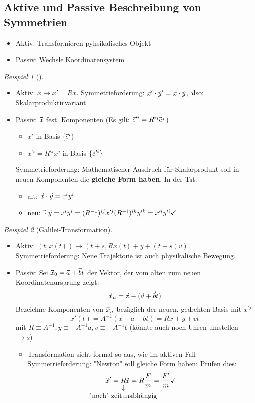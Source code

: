 \documentclass[a4paper]{scrartcl}
\renewcommand{\v}[1]{\mathrlap{\vec{\mkern-2mu\phantom{#1}}}#1}
\theoremstyle{definition}
\theoremstyle{plain}
\theoremstyle{remark}
\theoremstyle{remark}
\newtheorem{ex}{Beispiel}
\begin{document}
\subsection{Aktive und Passive Beschreibung von Symmetrien}
\label{sec-7-2}
\begin{itemize}
\item Aktiv: Transformieren pyhsikalisches Objekt
\item Passiv: Wechsle Koordinatensystem
\end{itemize}
\begin{ex}[]
\mbox{}
\begin{itemize}
\item Aktiv: $x \to x' = Rx$. Symmetrieforderung: $\v x' \cdot \v y' = \v x \cdot \v y$, also: Skalarproduktinvariant
\item Passiv: $\v x$ fest. Komponenten
(Es gilt: $\v e^{\prime i} = R^{ij} \v e^j$)
\begin{itemize}
\item $x^i$ in Basis $\{\v e^i\}$
\item $x^{\prime i} = R^{ij} x^j$ in Basis $\{\v e^{\prime i}\}$
\end{itemize}
Symmetrieforderung: Mathematischer Ausdruch für Skalarprodukt soll in neuen Komponenten die \textbf{gleiche Form haben}.
In der Tat:
\begin{itemize}
\item alt: $\v x \cdot \v y = x^i y^i$
\item neu: $\v \cdot \v y = x^i y^i = (R^{-1})^{ij} x^{\prime j} (R^{-1})^{ik} y^{\prime k} = x^{\prime i} y^{\prime i} \checkmark$
\end{itemize}
\end{itemize}
\end{ex}
\begin{ex}[Galilei-Transformation]
\begin{itemize}
\item Aktiv: $(t, x(t)) \to (t + s, R x(t) + y + (t + s) v)$. Symmetrieforderung: Neue
Trajektorie ist auch physikalische Bewegung.
\item Passiv: Sei $\v x_0 = \v a + \v b t$ der Vektor, der vom alten zum neuen Koordinatenursprung zeigt:
\[\v x_n = \v x - (\v a + \v b t)\]
Bezeichne Komponenten von $\v x_n$ bezüglich der neuen, gedrehten Basis mit $x^{\prime j}$
\[x'(t) = A^{-1}(x - a - bt) = Rx + y + v t\]
mit $R\equiv A^{-1}, y\equiv -A^{-1}a, v\equiv -A^{-1}b$ (könnte auch noch Uhren umstellen $\to s$)
\begin{itemize}
\item Transformation sieht formal so aus, wie im aktiven Fall \\
           Symmetrieforderung: "Newton" soll gleiche Form haben: Prüfen dies:
\[\ddot{x}' = \underarrow[R]{"noch" zeitunabhängig}\ddot{x} = R \frac{F}{m} = \frac{F'}{m} \checkmark\]
\end{itemize}
\end{itemize}
\end{ex}
\end{document}
